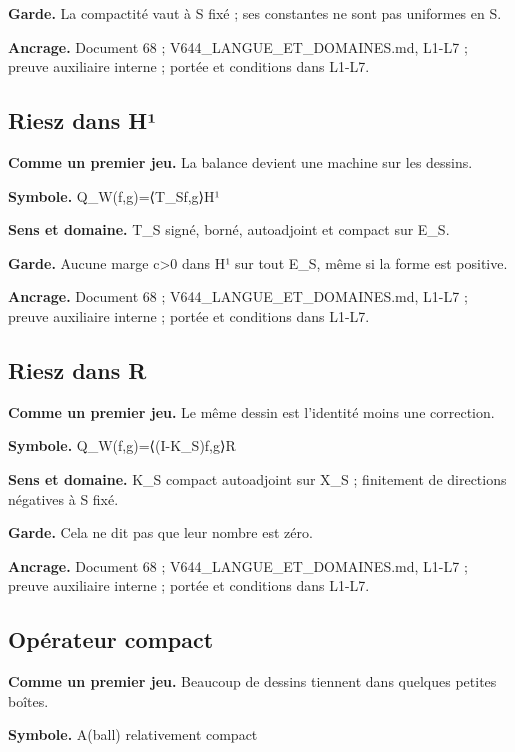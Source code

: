 \documentclass[
  9pt,
  a4paper,
]{article}
\begin{document}
\textbf{Garde.} La compactité vaut à S fixé ; ses constantes ne sont pas
uniformes en S.

\textbf{Ancrage.} Document 68 ; V644\_LANGUE\_ET\_DOMAINES.md, L1-L7 ;
preuve auxiliaire interne ; portée et conditions dans L1-L7.

\hypertarget{riesz-dans-huxb9}{%
\subsection{Riesz dans H¹}\label{riesz-dans-huxb9}}

\textbf{Comme un premier jeu.} La balance devient une machine sur les
dessins.

\textbf{Symbole.} Q\_W(f,g)=⟨T\_Sf,g⟩H¹

\textbf{Sens et domaine.} T\_S signé, borné, autoadjoint et compact sur
E\_S.

\textbf{Garde.} Aucune marge c\textgreater0 dans H¹ sur tout E\_S, même
si la forme est positive.

\textbf{Ancrage.} Document 68 ; V644\_LANGUE\_ET\_DOMAINES.md, L1-L7 ;
preuve auxiliaire interne ; portée et conditions dans L1-L7.

\hypertarget{riesz-dans-r}{%
\subsection{Riesz dans R}\label{riesz-dans-r}}

\textbf{Comme un premier jeu.} Le même dessin est l'identité moins une
correction.

\textbf{Symbole.} Q\_W(f,g)=⟨(I-K\_S)f,g⟩R

\textbf{Sens et domaine.} K\_S compact autoadjoint sur X\_S ; finitement
de directions négatives à S fixé.

\textbf{Garde.} Cela ne dit pas que leur nombre est zéro.

\textbf{Ancrage.} Document 68 ; V644\_LANGUE\_ET\_DOMAINES.md, L1-L7 ;
preuve auxiliaire interne ; portée et conditions dans L1-L7.

\hypertarget{opuxe9rateur-compact}{%
\subsection{Opérateur compact}\label{opuxe9rateur-compact}}

\textbf{Comme un premier jeu.} Beaucoup de dessins tiennent dans
quelques petites boîtes.

\textbf{Symbole.} A(ball) relativement compact
\end{document}
